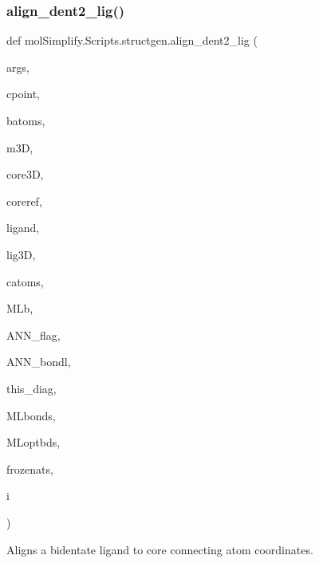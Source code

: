 \subsubsection{\texorpdfstring{align\+\_\+dent2\+\_\+lig()}{align\_dent2\_lig()}}
{\footnotesize\ttfamily def mol\+Simplify.\+Scripts.\+structgen.\+align\+\_\+dent2\+\_\+lig (\begin{DoxyParamCaption}\item[{}]{args,  }\item[{}]{cpoint,  }\item[{}]{batoms,  }\item[{}]{m3D,  }\item[{}]{core3D,  }\item[{}]{coreref,  }\item[{}]{ligand,  }\item[{}]{lig3D,  }\item[{}]{catoms,  }\item[{}]{M\+Lb,  }\item[{}]{A\+N\+N\+\_\+flag,  }\item[{}]{A\+N\+N\+\_\+bondl,  }\item[{}]{this\+\_\+diag,  }\item[{}]{M\+Lbonds,  }\item[{}]{M\+Loptbds,  }\item[{}]{frozenats,  }\item[{}]{i }\end{DoxyParamCaption})}



Aligns a bidentate ligand to core connecting atom coordinates. 


